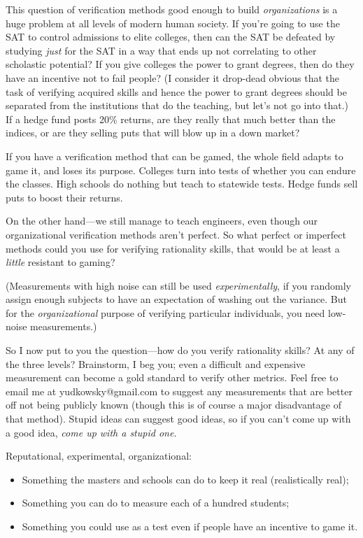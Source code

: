 {
 This question of verification methods good enough to build
\textit{organizations} is a huge problem at all levels of modern human
society. If you're going to use the SAT to control
admissions to elite colleges, then can the SAT be defeated by studying
\textit{just} for the SAT in a way that ends up not correlating to
other scholastic potential? If you give colleges the power to grant
degrees, then do they have an incentive not to fail people? (I consider
it drop-dead obvious that the task of verifying acquired skills and
hence the power to grant degrees should be separated from the
institutions that do the teaching, but let's not go
into that.) If a hedge fund posts 20\% returns, are they really that
much better than the indices, or are they selling puts that will blow
up in a down market?}

{
 If you have a verification method that can be gamed, the whole
field adapts to game it, and loses its purpose. Colleges turn into
tests of whether you can endure the classes. High schools do nothing
but teach to statewide tests. Hedge funds sell puts to boost their
returns.}

{
 On the other hand---we still manage to teach engineers, even
though our organizational verification methods aren't
perfect. So what perfect or imperfect methods could you use for
verifying rationality skills, that would be at least a \textit{little}
resistant to gaming?}

{
 (Measurements with high noise can still be used
\textit{experimentally}, if you randomly assign enough subjects to have
an expectation of washing out the variance. But for the
\textit{organizational} purpose of verifying particular individuals,
you need low-noise measurements.)}

{
 So I now put to you the question---how do you verify rationality
skills? At any of the three levels? Brainstorm, I beg you; even a
difficult and expensive measurement can become a gold standard to
verify other metrics. Feel free to email me at yudkowsky@gmail.com to
suggest any measurements that are better off not being publicly known
(though this is of course a major disadvantage of that method). Stupid
ideas can suggest good ideas, so if you can't come up
with a good idea, \textit{come up with a stupid one.}}

{
 Reputational, experimental, organizational:}

\begin{itemize}
\item {
 Something the masters and schools can do to keep it real
(realistically real);}

\item {
 Something you can do to measure each of a hundred students;}

\item {
 Something you could use as a test even if people have an incentive
 to game it.}
\end{itemize}

